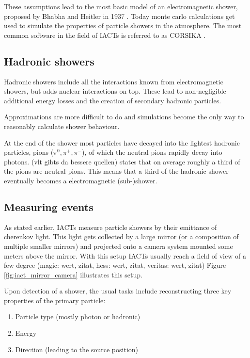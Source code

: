 These assumptions lead to the most basic model of an 
electromagnetic shower, proposed by Bhabha and Heitler in 1937
\cite{doi:10.1098/rspa.1937.0082}.
Today monte carlo calculations get used to simulate the properties 
of particle showers in the atmosphere.
The most common software in the field of IACTs is referred to as
CORSIKA \cite{Engel:2018akg}.

\subsection{Hadronic showers}
Hadronic showers include all the interactions known from 
electromagnetic showers, but adds nuclear interactions on top.
These lead to non-negligible additional energy losses 
and the creation of secondary hadronic particles.


Approximations are more difficult to do and simulations 
become the only way to reasonably calculate shower behaviour.

At the end of the shower most particles have decayed into the 
lightest hadronic particles, pions ($\pi^0, \pi^+, \pi^-$), of which the neutral pions 
rapidly decay into photons.
\cite{bookap} (vlt gibts da bessere quellen) states that on average
roughly a third of the pions are neutral pions. This means that 
a third of the hadronic shower eventually becomes a electromagnetic 
(sub-)shower.


\subsection{Measuring events}
As stated earlier, IACTs measure particle showers by their emittance of cherenkov 
light. This light gets collected by a large mirror (or a composition of 
multiple smaller mirrors) and projected onto a camera system mounted some 
meters above the mirror. 
With this setup IACTs usually reach a field of view of 
a few degree (magic: wert, zitat, hess: wert, zitat, veritas: wert, zitat)
Figure \ref{fig:iact_mirror_camera} illustrates this 
setup.

Upon detection of a shower, the usual tasks include reconstructing 
three key properties of the primary particle:
\begin{enumerate}
	\item{Particle type (mostly photon or hadronic)}
	\item{Energy}
	\item{Direction (leading to the source position)}
\end{enumerate}

